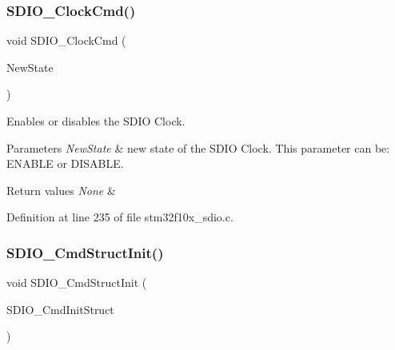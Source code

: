 \subsubsection{\texorpdfstring{S\+D\+I\+O\+\_\+\+Clock\+Cmd()}{SDIO\_ClockCmd()}}
{\footnotesize\ttfamily void S\+D\+I\+O\+\_\+\+Clock\+Cmd (\begin{DoxyParamCaption}\item[{\hyperlink{group___exported__types_gac9a7e9a35d2513ec15c3b537aaa4fba1}{Functional\+State}}]{New\+State }\end{DoxyParamCaption})}



Enables or disables the S\+D\+IO Clock. 


\begin{DoxyParams}{Parameters}
{\em New\+State} & new state of the S\+D\+IO Clock. This parameter can be\+: E\+N\+A\+B\+LE or D\+I\+S\+A\+B\+LE. \\
\hline
\end{DoxyParams}

\begin{DoxyRetVals}{Return values}
{\em None} & \\
\hline
\end{DoxyRetVals}


Definition at line 235 of file stm32f10x\+\_\+sdio.\+c.

\mbox{\label{group___s_d_i_o___exported___functions_ga09d9e89f49c87c82aec79c97b7068e24}} 
\subsubsection{\texorpdfstring{S\+D\+I\+O\+\_\+\+Cmd\+Struct\+Init()}{SDIO\_CmdStructInit()}}
{\footnotesize\ttfamily void S\+D\+I\+O\+\_\+\+Cmd\+Struct\+Init (\begin{DoxyParamCaption}\item[{\hyperlink{struct_s_d_i_o___cmd_init_type_def}{S\+D\+I\+O\+\_\+\+Cmd\+Init\+Type\+Def} $\ast$}]{S\+D\+I\+O\+\_\+\+Cmd\+Init\+Struct }\end{DoxyParamCaption})}



